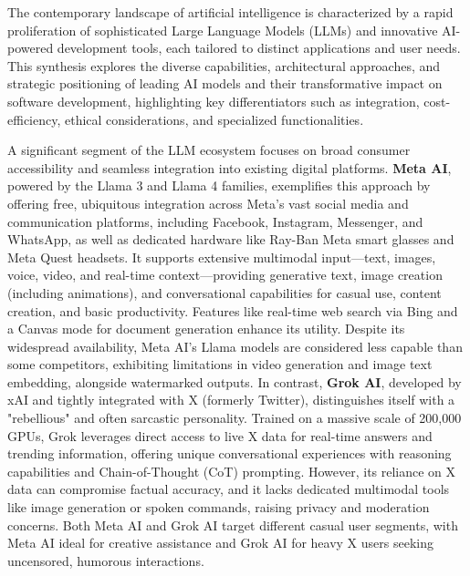 \documentclass[a4paper, 12pt]{article}
\begin{document}
The contemporary landscape of artificial intelligence is characterized by a rapid proliferation of sophisticated Large Language Models (LLMs) and innovative AI-powered development tools, each tailored to distinct applications and user needs. This synthesis explores the diverse capabilities, architectural approaches, and strategic positioning of leading AI models and their transformative impact on software development, highlighting key differentiators such as integration, cost-efficiency, ethical considerations, and specialized functionalities.

A significant segment of the LLM ecosystem focuses on broad consumer accessibility and seamless integration into existing digital platforms. \textbf{Meta AI}, powered by the Llama 3 and Llama 4 families, exemplifies this approach by offering free, ubiquitous integration across Meta's vast social media and communication platforms, including Facebook, Instagram, Messenger, and WhatsApp, as well as dedicated hardware like Ray-Ban Meta smart glasses and Meta Quest headsets. It supports extensive multimodal input—text, images, voice, video, and real-time context—providing generative text, image creation (including animations), and conversational capabilities for casual use, content creation, and basic productivity. Features like real-time web search via Bing and a Canvas mode for document generation enhance its utility. Despite its widespread availability, Meta AI's Llama models are considered less capable than some competitors, exhibiting limitations in video generation and image text embedding, alongside watermarked outputs. In contrast, \textbf{Grok AI}, developed by xAI and tightly integrated with X (formerly Twitter), distinguishes itself with a "rebellious" and often sarcastic personality. Trained on a massive scale of 200,000 GPUs, Grok leverages direct access to live X data for real-time answers and trending information, offering unique conversational experiences with reasoning capabilities and Chain-of-Thought (CoT) prompting. However, its reliance on X data can compromise factual accuracy, and it lacks dedicated multimodal tools like image generation or spoken commands, raising privacy and moderation concerns. Both Meta AI and Grok AI target different casual user segments, with Meta AI ideal for creative assistance and Grok AI for heavy X users seeking uncensored, humorous interactions.
\end{document}
